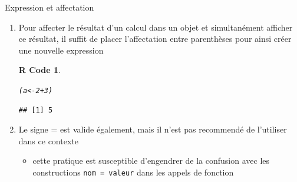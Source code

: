 \documentclass[11pt]{beamer}\usepackage[]{graphicx}\usepackage[]{color}
\makeatletter
\newcommand{\hlnum}[1]{\textcolor[rgb]{0.063,0.58,0.627}{#1}}%
\newcommand{\hlopt}[1]{\textcolor[rgb]{0.196,0.196,0.196}{#1}}%
\newcommand{\hlstd}[1]{\textcolor[rgb]{0.196,0.196,0.196}{#1}}%
\newcommand{\hlkwb}[1]{\textcolor[rgb]{0.627,0,0.314}{#1}}%
\newenvironment{kframe}{%
 \def\at@end@of@kframe{}%
 \ifinner\ifhmode%
  \def\at@end@of@kframe{\end{minipage}}%
  \begin{minipage}{\columnwidth}%
 \fi\fi%
 \def\FrameCommand##1{\hskip\@totalleftmargin \hskip-\fboxsep
 \colorbox{shadecolor}{##1}\hskip-\fboxsep
     \hskip-\linewidth \hskip-\@totalleftmargin \hskip\columnwidth}%
 \MakeFramed {\advance\hsize-\width
   \@totalleftmargin\z@ \linewidth\hsize
   \@setminipage}}%
 {\par\unskip\endMakeFramed%
 \at@end@of@kframe}
\newenvironment{knitrout}{}{} %
\newtheorem{rcode}{R Code}[section]
\newcommand{\code}[1]{\texttt{#1}}
\newcounter{saveenumi}
\newcommand{\conti}{\setcounter{enumi}{\value{saveenumi}}}
\makeatother
\begin{document}
\begin{frame}[fragile]{Expression et affectation} 
\begin{enumerate}
\conti
\item Pour affecter le résultat d’un calcul dans un objet et simultanément afficher ce résultat, il suffit de placer l'affectation entre parenthèses pour ainsi créer une nouvelle expression
\pause
\begin{knitrout}
\color{fgcolor}\begin{kframe}
\begin{rcode}\label{unnamed-chunk-11}\hfill{}\begin{alltt}
\hlstd{(a} \hlkwb{<-} \hlnum{2} \hlopt{+} \hlnum{3}\hlstd{)}
\end{alltt}
\begin{verbatim}
## [1] 5
\end{verbatim}
\end{rcode}\end{kframe}
\end{knitrout}
\pause \item Le signe = est valide également, mais il n'est pas recommendé de l'utiliser dans ce contexte
\begin{itemize}
\item cette pratique est susceptible d'engendrer de la confusion avec les constructions \code{nom = valeur} dans les appels de fonction
\end{itemize}

\end{enumerate}

\end{frame}
\end{document}
